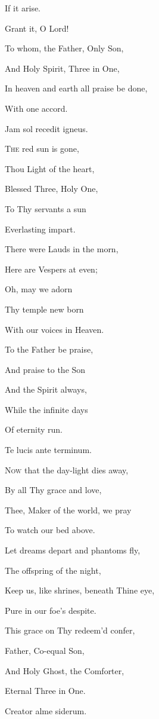 If it arise.

Grant it, O Lord!

To whom, the Father, Only Son,

And Holy Spirit, Three in One,

In heaven and earth all praise be done,

With one accord.


Jam sol recedit igneus.

T\textsc{he} red sun is gone,

Thou Light of the heart,

Blessed Three, Holy One,

To Thy servants a sun

Everlasting impart.

There were Lauds in the morn,

Here are Vespers at even;

Oh, may we adorn

Thy temple new born

With our voices in
Heaven.

To the Father be praise,

And praise to the Son

And the Spirit always,

While the infinite days

Of eternity run.


Te lucis ante terminum.

N\textsc{ow} that the day-light dies away,

By all Thy grace and love,

Thee, Maker of the world, we pray

To watch our bed above.

Let dreams depart and phantoms fly,

The offspring of the night,

Keep us, like shrines, beneath Thine eye,

Pure in our foe's despite.

This grace on Thy redeem'd confer,

Father, Co-equal Son,

And Holy Ghost, the Comforter,

Eternal Three in One.


Creator alme siderum.

